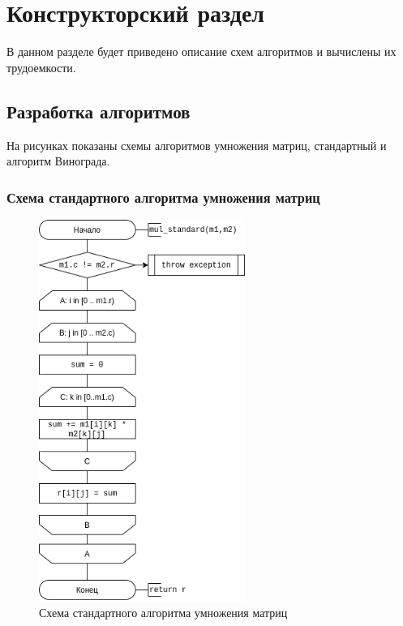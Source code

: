 \chapter{Конструкторский раздел}
\label{cha:design}

В данном разделе будет приведено описание схем алгоритмов
и вычислены их трудоемкости.

\section{Разработка алгоритмов}

На рисунках показаны схемы алгоритмов умножения матриц, стандартный и алгоритм Винограда.


\pagebreak
\subsection{Схема стандартного алгоритма умножения матриц}

\begin{figure}[h]
    \centering
    \includegraphics[width=0.6\textwidth]{2/inc/d1.png}
    \caption{Схема стандартного алгоритма умножения матриц}
    \label{fig:2.1}
\end{figure}


